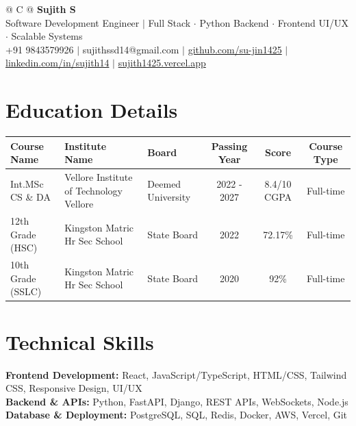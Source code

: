\documentclass[a4paper,10pt]{article}
\newcommand{\ulink}[2]{\href{#1}{#2}}
\begin{document}
\pagestyle{empty}

\begin{tabularx}{\linewidth}{@{} C @{}}
{\color[HTML]{000000}\fontsize{30}{35}\selectfont\bfseries Sujith S} \\[5pt]
{\fontsize{10.5}{12.5}\selectfont\color[HTML]{3A3A3A}
Software Development Engineer $|$ Full Stack $\cdot$ Python Backend $\cdot$ Frontend UI/UX $\cdot$ Scalable Systems} \\[6pt]
{\fontsize{9.5}{11.5}\selectfont\textcolor[HTML]{3A3A3A}{+91 9843579926 $|$ sujithssd14@gmail.com $|$ \ulink{https://github.com/su-jin1425}{github.com/su-jin1425} $|$ \ulink{https://linkedin.com/in/sujith14}{linkedin.com/in/sujith14} $|$ \ulink{https://sujith1425.vercel.app}{sujith1425.vercel.app}}}
\end{tabularx}

\section{Education Details}
\vspace{4pt}

{\fontsize{10}{13}\selectfont
\renewcommand{\arraystretch}{1.3}
\begin{tabularx}{\linewidth}{|l|X|X|c|c|c|}
\hline
\textbf{Course Name} & \textbf{Institute Name} & \textbf{Board} & \textbf{Passing Year} & \textbf{Score} & \textbf{Course Type} \\
\hline
Int.MSc CS \& DA & Vellore Institute of Technology Vellore & Deemed University & 2022 - 2027 & 8.4/10 CGPA & Full-time \\
\hline
12th Grade (HSC) & Kingston Matric Hr Sec School & State Board & 2022 & 72.17\% & Full-time \\
\hline
10th Grade (SSLC) & Kingston Matric Hr Sec School & State Board & 2020 & 92\% & Full-time \\
\hline
\end{tabularx}
}

\section{Technical Skills}
\vspace{2pt}
{\color[HTML]{0A0A0A}\fontsize{11}{14}\selectfont
\textbf{Frontend Development:} React, JavaScript/TypeScript, HTML/CSS, Tailwind CSS, Responsive Design, UI/UX \\[2pt]
\textbf{Backend \& APIs:} Python, FastAPI, Django, REST APIs, WebSockets, Node.js \\[2pt]
\textbf{Database \& Deployment:} PostgreSQL, SQL, Redis, Docker, AWS, Vercel, Git}
\end{document}
